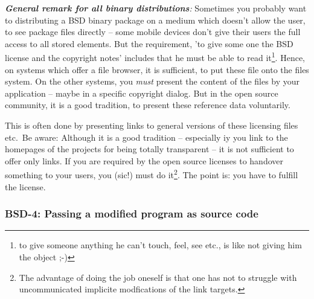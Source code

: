 \begin{itshape}
\emph{\textbf{General remark for all binary distributions}:} 
\label{MobileDeviceHint} Sometimes you probably want to distributing a BSD
bi\-na\-ry package on a medium which doesn't allow the user, to see package
files directly -- some mobile devices don't give their users the full access to
all stored elements. But the requirement, 'to give some one the BSD license and
the copyright notes' includes that he must be able to read it\footnote{to give
someone anything he can't touch, feel, see etc., is like not giving him the
object ;-)}. Hence, on systems which offer a file browser, it is sufficient, to
put these file onto the files system. On the other systems, you \emph{must}
present the content of the files by your application -- maybe in a specific
copyright dialog. But in the open source community, it is a good tradition, to
present these reference data voluntarily.

This is often done by presenting links to general versions of these licensing
files etc.\ Be aware: Although it is a good tradition -- especially iy you link
to the homepages of the projects for being totally transparent -- it is not
sufficient to offer only links. If you are required by the open source licenses
to handover something to your users, you (sic!) must do it\footnote{The
advantage of doing the job oneself is that one has not to struggle with
uncommunicated implicite modfications of the link targets.}. The point is: you
have to fulfill the license.
\end{itshape}

\subsubsection{BSD-4: Passing a modified program as source code}
\label{OSUC-04-BSD}

